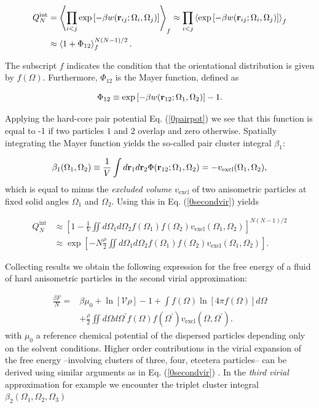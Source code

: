 {\begin{align}
Q_{N}^{\text{int}}&= \left \langle \prod _{i<j}
\exp\left[-\beta w({\bf r} _{ij}; \Omega_{i}, \Omega_{j})\right]  \right \rangle _{f}
\approx \prod _{i<j}
\left < \exp\left[-\beta w({\bf r} _{ij}; \Omega_{i}, \Omega_{j})\right]  \right>_{f} \nonumber \\
&\approx\left<1+\Phi_{12}\right>_{f} ^{N(N-1)/2}. \label{0secondvir}
\end{align}

The subscript $f$ indicates the condition that the orientational distribution is given by $f(\Omega)$. Furthermore, $\Phi_{12}$ is the Mayer function, defined as

\begin{equation}
\Phi_{12}\equiv \exp\left[-\beta w({\bf r} _{12}; \Omega_{1}, \Omega_{2})\right]-1.
\end{equation}

Applying the hard-core pair potential Eq. (\ref{0pairpot}) we see that this function is equal to -1  if two particles $1$ and $2$ overlap and zero otherwise. Spatially integrating the Mayer function yields the so-called pair cluster integral $\beta _{1}$:

\begin{equation}
\beta_{1}(\Omega_{1},\Omega_{2})\equiv \frac{1}{V} \int d{\bf r}_{1}d {\bf r}_{2} \Phi({\bf r} _{12}; \Omega_{1}, \Omega_{2})=-v_{\text{excl}}(\Omega_{1},\Omega_{2}),
\label{0cluster}
\end{equation}
which is equal to minus the {\em excluded volume} $v_{\text{excl}}$ of two anisometric particles at fixed solid angles $\Omega_{1}$ and $\Omega_{2}$. Using this in Eq. (\ref{0secondvir}) yields

\begin{align}
Q_{N}^{\text{int}}&\approx \left[1-\frac{1}{V} \iint d\Omega_{1} d\Omega_{2}
f(\Omega_{1})f(\Omega_{2})v_{\text{excl}}(\Omega_{1},\Omega_{2})\right]^{N(N-1)/2} \nonumber \\
&\approx \exp\left[-N \frac{\rho}{2}  \iint d\Omega_{1} d\Omega_{2}
f(\Omega_{1})f(\Omega_{2})v_{\text{excl}}(\Omega_{1},\Omega_{2})  \right].
\end{align}

Collecting results we obtain the following expression for the free energy of a fluid of hard anisometric particles in the second virial approximation:

\begin{align}
\frac{\beta F}{N} =& \beta \mu_{0}+\ln\left[\mathcal{V}\rho\right]-1+
\int f(\Omega)\ln \left[4\pi f(\Omega)\right]d\Omega \nonumber \\
&+\frac{\rho}{2} \iint d\Omega d\Omega^{\prime}
f(\Omega)f(\Omega^{\prime})v_{\text{excl}}(\Omega,\Omega^{\prime}). \label{0freetot}
\end{align}
with $\mu_{0}$ a reference chemical potential of the dispersed particles depending only on the solvent conditions. Higher order contributions in the virial expansion of the free energy --involving clusters of three, four, etcetera particles-- can be derived using similar arguments as in Eq. (\ref{0secondvir}) \cite{vankampen}. In the {\em third virial} approximation for example we encounter the triplet cluster integral $\beta_{2}(\Omega_{1},\Omega_{2},\Omega_{3})$

}
